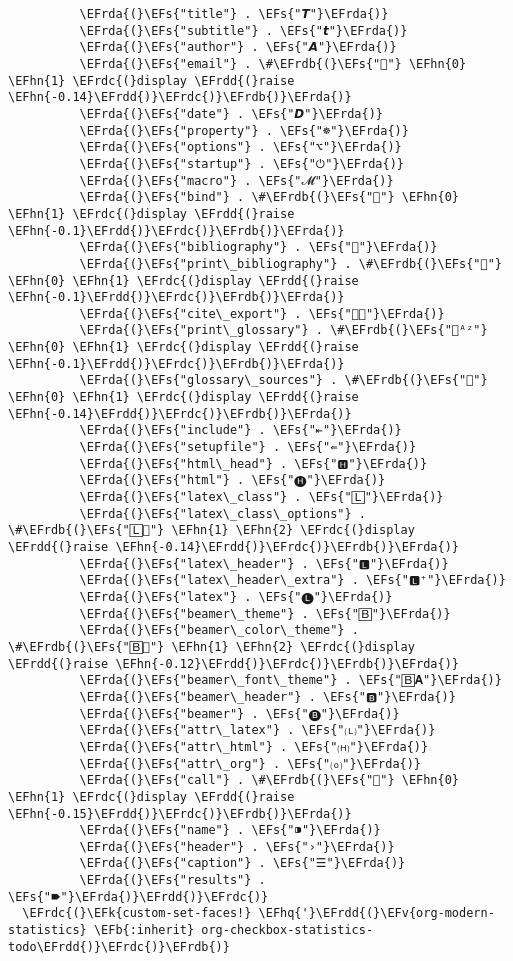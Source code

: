 \documentclass{article}
\newcommand{\EFs}[1]{\textcolor{EFs}{#1}} %
\newcommand{\EFk}[1]{\textcolor{EFk}{#1}} %
\newcommand{\EFb}[1]{\textcolor{EFb}{#1}} %
\newcommand{\EFv}[1]{\textcolor{EFv}{#1}} %
\newcommand{\EFhn}[1]{\textcolor{EFhn}{\textbf{#1}}} %
\newcommand{\EFhq}[1]{#1} %
\newcommand{\EFrda}[1]{\textcolor{EFrda}{#1}} %
\newcommand{\EFrdb}[1]{\textcolor{EFrdb}{#1}} %
\newcommand{\EFrdc}[1]{\textcolor{EFrdc}{#1}} %
\newcommand{\EFrdd}[1]{\textcolor{EFrdd}{#1}} %
\begin{document}
\begin{Code}
\begin{Verbatim}
          \EFrda{(}\EFs{"title"} . \EFs{"𝙏"}\EFrda{)}
          \EFrda{(}\EFs{"subtitle"} . \EFs{"𝙩"}\EFrda{)}
          \EFrda{(}\EFs{"author"} . \EFs{"𝘼"}\EFrda{)}
          \EFrda{(}\EFs{"email"} . \#\EFrdb{(}\EFs{""} \EFhn{0} \EFhn{1} \EFrdc{(}display \EFrdd{(}raise \EFhn{-0.14}\EFrdd{)}\EFrdc{)}\EFrdb{)}\EFrda{)}
          \EFrda{(}\EFs{"date"} . \EFs{"𝘿"}\EFrda{)}
          \EFrda{(}\EFs{"property"} . \EFs{"☸"}\EFrda{)}
          \EFrda{(}\EFs{"options"} . \EFs{"⌥"}\EFrda{)}
          \EFrda{(}\EFs{"startup"} . \EFs{"⏻"}\EFrda{)}
          \EFrda{(}\EFs{"macro"} . \EFs{"𝓜"}\EFrda{)}
          \EFrda{(}\EFs{"bind"} . \#\EFrdb{(}\EFs{""} \EFhn{0} \EFhn{1} \EFrdc{(}display \EFrdd{(}raise \EFhn{-0.1}\EFrdd{)}\EFrdc{)}\EFrdb{)}\EFrda{)}
          \EFrda{(}\EFs{"bibliography"} . \EFs{""}\EFrda{)}
          \EFrda{(}\EFs{"print\_bibliography"} . \#\EFrdb{(}\EFs{""} \EFhn{0} \EFhn{1} \EFrdc{(}display \EFrdd{(}raise \EFhn{-0.1}\EFrdd{)}\EFrdc{)}\EFrdb{)}\EFrda{)}
          \EFrda{(}\EFs{"cite\_export"} . \EFs{"⮭"}\EFrda{)}
          \EFrda{(}\EFs{"print\_glossary"} . \#\EFrdb{(}\EFs{"ᴬᶻ"} \EFhn{0} \EFhn{1} \EFrdc{(}display \EFrdd{(}raise \EFhn{-0.1}\EFrdd{)}\EFrdc{)}\EFrdb{)}\EFrda{)}
          \EFrda{(}\EFs{"glossary\_sources"} . \#\EFrdb{(}\EFs{""} \EFhn{0} \EFhn{1} \EFrdc{(}display \EFrdd{(}raise \EFhn{-0.14}\EFrdd{)}\EFrdc{)}\EFrdb{)}\EFrda{)}
          \EFrda{(}\EFs{"include"} . \EFs{"⇤"}\EFrda{)}
          \EFrda{(}\EFs{"setupfile"} . \EFs{"⇚"}\EFrda{)}
          \EFrda{(}\EFs{"html\_head"} . \EFs{"🅷"}\EFrda{)}
          \EFrda{(}\EFs{"html"} . \EFs{"🅗"}\EFrda{)}
          \EFrda{(}\EFs{"latex\_class"} . \EFs{"🄻"}\EFrda{)}
          \EFrda{(}\EFs{"latex\_class\_options"} . \#\EFrdb{(}\EFs{"🄻"} \EFhn{1} \EFhn{2} \EFrdc{(}display \EFrdd{(}raise \EFhn{-0.14}\EFrdd{)}\EFrdc{)}\EFrdb{)}\EFrda{)}
          \EFrda{(}\EFs{"latex\_header"} . \EFs{"🅻"}\EFrda{)}
          \EFrda{(}\EFs{"latex\_header\_extra"} . \EFs{"🅻⁺"}\EFrda{)}
          \EFrda{(}\EFs{"latex"} . \EFs{"🅛"}\EFrda{)}
          \EFrda{(}\EFs{"beamer\_theme"} . \EFs{"🄱"}\EFrda{)}
          \EFrda{(}\EFs{"beamer\_color\_theme"} . \#\EFrdb{(}\EFs{"🄱"} \EFhn{1} \EFhn{2} \EFrdc{(}display \EFrdd{(}raise \EFhn{-0.12}\EFrdd{)}\EFrdc{)}\EFrdb{)}\EFrda{)}
          \EFrda{(}\EFs{"beamer\_font\_theme"} . \EFs{"🄱𝐀"}\EFrda{)}
          \EFrda{(}\EFs{"beamer\_header"} . \EFs{"🅱"}\EFrda{)}
          \EFrda{(}\EFs{"beamer"} . \EFs{"🅑"}\EFrda{)}
          \EFrda{(}\EFs{"attr\_latex"} . \EFs{"🄛"}\EFrda{)}
          \EFrda{(}\EFs{"attr\_html"} . \EFs{"🄗"}\EFrda{)}
          \EFrda{(}\EFs{"attr\_org"} . \EFs{"⒪"}\EFrda{)}
          \EFrda{(}\EFs{"call"} . \#\EFrdb{(}\EFs{""} \EFhn{0} \EFhn{1} \EFrdc{(}display \EFrdd{(}raise \EFhn{-0.15}\EFrdd{)}\EFrdc{)}\EFrdb{)}\EFrda{)}
          \EFrda{(}\EFs{"name"} . \EFs{"⁍"}\EFrda{)}
          \EFrda{(}\EFs{"header"} . \EFs{"›"}\EFrda{)}
          \EFrda{(}\EFs{"caption"} . \EFs{"☰"}\EFrda{)}
          \EFrda{(}\EFs{"results"} . \EFs{"🠶"}\EFrda{)}\EFrdd{)}\EFrdc{)}
  \EFrdc{(}\EFk{custom-set-faces!} \EFhq{'}\EFrdd{(}\EFv{org-modern-statistics} \EFb{:inherit} org-checkbox-statistics-todo\EFrdd{)}\EFrdc{)}\EFrdb{)}


\end{Verbatim}
\end{Code}
\end{document}

